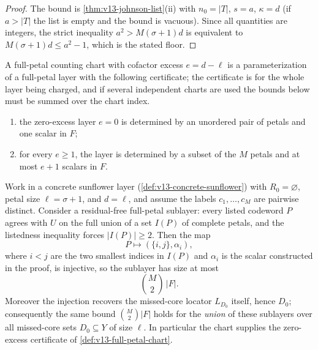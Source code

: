 \begin{proof}
The bound is \cref{thm:v13-johnson-list}\textup{(ii)} with $n_0=|T|$, $s=a$, $\kappa=d$ \textup(if $a>|T|$ the list is empty and the bound is vacuous\textup).  Since all quantities are integers, the strict inequality $a^2>M(\sigma+1)d$ is equivalent to $M(\sigma+1)d\le a^2-1$, which is the stated floor.
\end{proof}

\begin{definition}\label{def:v13-full-petal-chart}
A full-petal counting chart with cofactor excess $e=d-\ell$ is a parameterization of a full-petal layer with the following certificate; the certificate is for the whole layer being charged, and if several independent charts are used the bounds below must be summed over the chart index.
\begin{enumerate}[label=\textup{(\roman*)}]
\item the zero-excess layer $e=0$ is determined by an unordered pair of petals and one scalar in $F$;
\item for every $e\ge1$, the layer is determined by a subset of the $M$ petals and at most $e+1$ scalars in $F$.
\end{enumerate}
\end{definition}

\begin{proposition}\label{prop:v13-zero-excess-chart}
Work in a concrete sunflower layer \textup(\cref{def:v13-concrete-sunflower}\textup) with $R_0=\varnothing$, petal size $\ell=\sigma+1$, and $d=\ell$, and assume the labels $c_1,\ldots,c_M$ are pairwise distinct.  Consider a residual-free full-petal sublayer: every listed codeword $P$ agrees with $U$ on the full union of a set $I(P)$ of complete petals, and the listedness inequality forces $|I(P)|\ge2$.  Then the map
\[
        P\longmapsto(\{i,j\},\alpha_i),
\]
where $i<j$ are the two smallest indices in $I(P)$ and $\alpha_i$ is the scalar constructed in the proof, is injective, so the sublayer has size at most
\[
        \binom M2\,|F| .
\]
Moreover the injection recovers the missed-core locator $L_{D_0}$ itself, hence $D_0$; consequently the same bound $\binom M2|F|$ holds for the \emph{union} of these sublayers over all missed-core sets $D_0\subseteq Y$ of size $\ell$.  In particular the chart supplies the zero-excess certificate of \cref{def:v13-full-petal-chart}.
\end{proposition}

